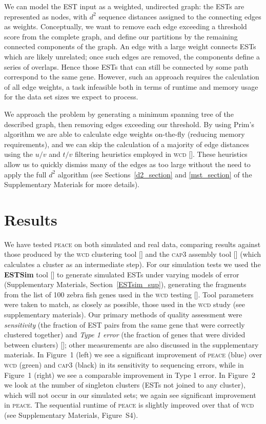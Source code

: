 \documentclass{bioinfo}
\begin{document}
We can model the EST input as a weighted, undirected graph: the ESTs
are represented as nodes, with $d^2$ sequence distances assigned to
the connecting edges as weights.  Conceptually, we want to remove each
edge exceeding a threshold score from the complete graph, and define
our partitions by the remaining connected components of the graph.  An
edge with a large weight connects ESTs which are likely unrelated;
once such edges are removed, the components define a series of
overlaps.  Hence those ESTs that can still be connected by some path
correspond to the same gene.  However, such an approach requires the
calculation of all edge weights, a task infeasible both in terms of
runtime and memory usage for the data set sizes we expect to process.

We approach the problem by generating a minimum spanning tree of the
described graph, then removing edges exceeding our threshold.  By
using Prim's algorithm we are able to calculate edge weights
on-the-fly (reducing memory requirements), and we can skip the
calculation of a majority of edge distances using the $u/v$ and $t/v$
filtering heuristics employed in \textsc{wcd} [\cite{Hazelhurst08a}].
These heuristics allow us to quickly dismiss many of the edges as too
large without the need to apply the full $d^2$ algorithm (see
Sections~\ref{d2_section} and \ref{mst_section} of the Supplementary
Materials for more details). 

\section{Results}

We have tested \textsc{peace} on both simulated and real data,
comparing results against those produced by the \textsc{wcd}
clustering tool [\cite{Hazelhurst08a}] and the \textsc{cap3} assembly
tool [\cite{Huang99}] (which calculates a cluster as an intermediate
step).  For our simulation tests we used the {\bf ESTSim} tool
[\cite{Hazelhurst03}] to generate simulated ESTs under varying models
of error (Supplementary Materials, Section~\ref{ESTsim_sup}),
generating the fragments from the list of 100 zebra fish genes used in
the \textsc{wcd} testing [\cite{Hazelhurst08a}].  Tool parameters were
taken to match, as closely as possible, those used in the \textsc{wcd}
study (see supplementary materials).  Our primary methods of quality
assessment were {\it sensitivity} (the fraction of EST pairs from the
same gene that were correctly clustered together) and {\it Type 1
  error} (the fraction of genes that were divided between clusters)
[\cite{Wang04,Hazelhurst08a}]; other measurements are also discussed
in the supplementary materials.  In Figure~1 (left) we see a
significant improvement of \textsc{peace} (blue) over \textsc{wcd}
(green) and \textsc{cap3} (black) in its sensitivity to sequencing
errors, while in Figure~1 (right) we see a comparable
improvement in Type 1 error.  In Figure~2 we look at
the number of singleton clusters (ESTs not joined to any cluster),
which will not occur in our simulated sets; we again see significant
improvement in \textsc{peace}.  The sequential runtime of
\textsc{peace} is slightly improved over that of \textsc{wcd} (see
Supplementary Materials, Figure~S4).
\end{document}
